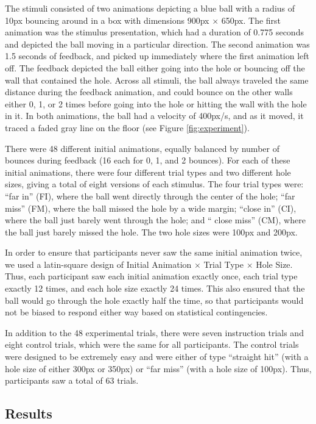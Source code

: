 \documentclass[10pt,letterpaper]{article}
\begin{document}
The stimuli consisted of two animations depicting a blue ball with a radius of 10px bouncing around in a box with dimensions 900px $\times$ 650px.
The first animation was the stimulus presentation, which had a duration of 0.775 seconds and depicted the ball moving in a particular direction.
The second animation was 1.5 seconds of feedback, and picked up immediately where the first animation left off.
The feedback depicted the ball either going into the hole or bouncing off the wall that contained the hole.
Across all stimuli, the ball always traveled the same distance during the feedback animation, and could bounce on the other walls either 0, 1, or 2 times before going into the hole or hitting the wall with the hole in it.
In both animations, the ball had a velocity of 400px/s, and as it moved, it traced a faded gray line on the floor (see Figure \ref{fig:experiment}).

There were 48 different initial animations, equally balanced by number of bounces during feedback (16 each for 0, 1, and 2 bounces). 
For each of these initial animations, there were four different trial types and two different hole sizes, giving a total of eight versions of each stimulus. 
The four trial types were: ``far in'' (FI), where the ball went directly through the center of the hole; ``far miss'' (FM), where the ball missed the hole by a wide margin; ``close in'' (CI), where the ball just barely went through the hole; and `` close miss'' (CM), where the ball just barely missed the hole. 
The two hole sizes were 100px and 200px.

In order to ensure that participants never saw the same initial animation twice, we used a latin-square design of Initial Animation $\times$ Trial Type $\times$ Hole Size.
Thus, each participant saw each initial animation exactly once, each trial type exactly 12 times, and each hole size exactly 24 times.
This also ensured that the ball would go through the hole exactly half the time, so that participants would not be biased to respond either way based on statistical contingencies.

In addition to the 48 experimental trials, there were seven instruction trials and eight control trials, which were the same for all participants.
The control trials were designed to be extremely easy and were either of type ``straight hit'' (with a hole size of either 300px or 350px) or ``far miss'' (with a hole size of 100px).
Thus, participants saw a total of 63 trials.

\subsection{Results}
\end{document}
